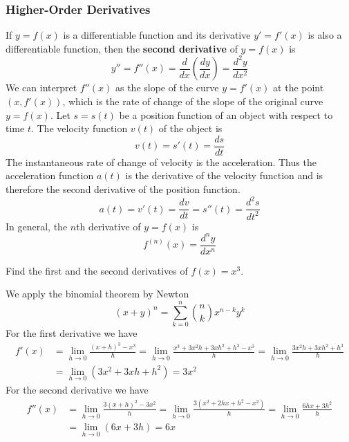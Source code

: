\subsubsection*{Higher-Order Derivatives}
 If \(y=f(x)\) is a differentiable function and its derivative \(y'=f'(x)\) is
 also a differentiable function,
 then the \textbf{second derivative} of \(y=f(x)\) is
\[y''=f''(x)=\frac{d}{dx}\left(\frac{dy}{dx}\right)=\frac{d^2y}{dx^2}\]
We can interpret \(f''(x)\) as the slope of the curve \(y=f'(x)\) at the point
\((x,f'(x))\), which is the rate of change of the slope of the original curve
\(y=f(x)\).
Let \(s=s(t)\) be a position function of an object with respect to time \(t\).
The velocity function \(v(t)\) of the object is \[v(t)=s'(t)=\frac{ds}{dt}\]
The instantaneous rate of change of velocity is the acceleration.
Thus the acceleration function \(a(t)\) is the derivative of the velocity
function and is therefore the second derivative of the position function.
\[a(t)=v'(t)=\frac{dv}{dt}=s''(t)=\frac{d^2s}{dt^2}\]
In general, the \(n\)th derivative of \(y=f(x)\) is
\[f^{(n)}(x)=\frac{d^ny}{dx^n}\]
\begin{problem}
    Find the first and the second derivatives of \(f(x)=x^3\).
\end{problem}
\begin{solution}
    We apply the binomial theorem by Newton
    \[(x+y)^n=\sum_{k=0}^n \binom{n}{k}x^{n-k}y^k\]
    For the first derivative we have
    \begin{align*}
        f'(x) &= \lim_{h\to 0}\frac{(x+h)^3-x^3}{h}=\lim_{h\to 0}
        \frac{x^3+3x^2h+3xh^2+h^3-x^3}{h}
        =\lim_{h\to 0}\frac{3x^2h+3xh^2+h^3}{h} \\
        &= \lim_{h\to 0}(3x^2+3xh+h^2)=3x^2
    \end{align*}
    For the second derivative we have
    \begin{align*}
        f''(x) &= \lim_{h\to 0}\frac{3(x+h)^2-3x^2}{h}
        =\lim_{h\to 0}\frac{3(x^2+2hx+h^2-x^2)}{h}
        =\lim_{h\to 0}\frac{6hx+3h^2}{h} \\
        &= \lim_{h\to 0}(6x+3h)=6x 
    \end{align*}
\end{solution}